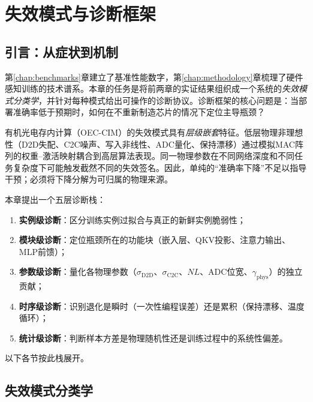 
\chapter{失效模式与诊断框架}
\label{ch:failure_modes}

\section{引言：从症状到机制}

第\ref{chap:benchmarks}章建立了基准性能数字，第\ref{chap:methodology}章梳理了硬件感知训练的技术谱系。本章的任务是将前两章的实证结果组织成一个系统的\emph{失效模式分类学}，并针对每种模式给出可操作的诊断协议。诊断框架的核心问题是：当部署准确率低于预期时，如何在不重新制造芯片的情况下定位主导瓶颈？

有机光电存内计算（OEC-CIM）的失效模式具有\emph{层级嵌套}特征。低层物理非理想性（D2D失配、C2C噪声、写入非线性、ADC量化、保持漂移）通过模拟MAC阵列的权重--激活映射耦合到高层算法表现。同一物理参数在不同网络深度和不同任务复杂度下可能触发截然不同的失效签名。因此，单纯的“准确率下降”不足以指导干预；必须将下降分解为可归属的物理来源。

本章提出一个五层诊断栈：
\begin{enumerate}
    \item \textbf{实例级诊断}：区分训练实例过拟合与真正的新鲜实例脆弱性；
    \item \textbf{模块级诊断}：定位瓶颈所在的功能块（嵌入层、QKV投影、注意力输出、MLP前馈）；
    \item \textbf{参数级诊断}：量化各物理参数（$\sigma_{\mathrm{D2D}}$、$\sigma_{\mathrm{C2C}}$、$NL$、ADC位宽、$\gamma_{\mathrm{phys}}$）的独立贡献；
    \item \textbf{时序级诊断}：识别退化是瞬时（一次性编程误差）还是累积（保持漂移、温度循环）；
    \item \textbf{统计级诊断}：判断样本方差是物理随机性还是训练过程中的系统性偏差。
\end{enumerate}

以下各节按此栈展开。


\section{失效模式分类学}
\label{sec:failure_taxonomy}

